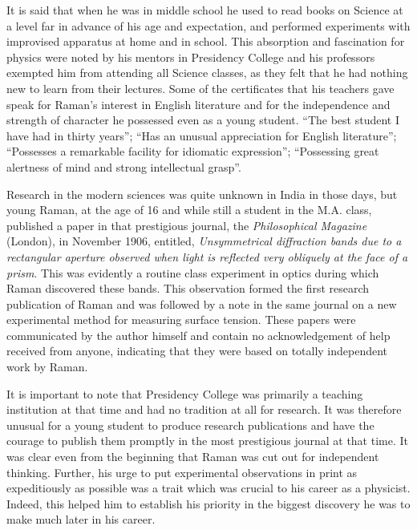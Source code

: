 It is said that when he was in middle school he used to read books on Science at a level far in advance of his age and
expectation, and performed experiments with improvised apparatus at home and in school. This absorption and fascination for physics were noted by his mentors in Presidency College and his professors exempted him from attending all Science classes, as they felt that he had nothing new to learn from their lectures. Some of the certificates that his teachers gave speak for Raman's interest in English literature and for the independence and strength of character he possessed even as a young student. ``The best student I have had in thirty years''; ``Has an unusual appreciation for English literature''; ``Possesses a remarkable facility for idiomatic expression''; ``Possessing great alertness of mind and
strong intellectual grasp''.

Research in the modern sciences was quite unknown in India in those days, but young Raman, at the age of 16 and while still a student in the M.A. class, published a paper in that prestigious journal, the {\em Philosophical Magazine} (London), in November 1906, entitled, {\em Unsymmetrical diffraction bands due to a rectangular aperture observed when light is reflected very obliquely at the face of a prism}. This was evidently a routine class experiment in optics during which Raman discovered these bands. This observation formed the first research publication of Raman and was followed by a note in the same journal on a new experimental method for measuring surface tension. These papers were communicated by the author himself and contain no acknowledgement of help received from anyone, indicating that they were based on totally independent work by Raman.

\newpage

It is important to note that Presidency College was primarily a teaching institution at that time and had no tradition at all for research. It was therefore unusual for a young student to produce research publications and have the courage to publish them promptly in the most prestigious journal at that time. It was clear even from the beginning that Raman was cut out for independent thinking. Further, his urge to put experimental observations in print as expeditiously as possible was a trait which was crucial to his career as a physicist. Indeed, this helped him to establish his priority in the biggest discovery he was to make much later in his career.

